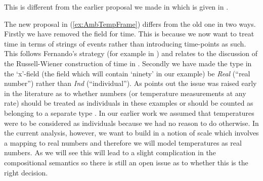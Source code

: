 This is different from the earlier proposal we made in
\cite{Cooper2012} which is given in \nexteg{}.
\begin{ex} 
\end{ex} 
The new proposal in (\ref{ex:AmbTempFrame}) differs from the old one in two
ways.  Firstly we have removed the field for time.  This is because we
now want to treat time in terms of strings of events rather than
introducing time-points as such. This follows 
Fernando's strategy (for example in \citealp{Fernando2011}) and
relates to the discussion of the Russell-Wiener construction of time
in \cite{Kamp1979}.  Secondly we have made the type in the `x'-field
(the field which will contain `ninety' in our example) be
\textit{Real} (``real number'')  rather than \textit{Ind}
(``individual'').  As \cite{Lasersohn2005a} points out the issue was
raised early in the literature as to whether numbers (or temperature
measurements at any rate) should be treated
as individuals in these examples or should be counted as belonging to
a separate type \citep{Bennett1974,Thomason1979}.  In our earlier work
we assumed that temperatures were to be considered as individuals
because we had no reason to do otherwise.  In the current analysis,
however, we want to build in a notion of scale which involves a
mapping to real numbers and therefore we will model temperatures as
real numbers.  As we will see this will lead to a slight complication
in the compositional semantics so there is still an open issue as to
whether this is the right decision.

